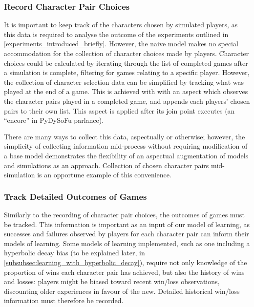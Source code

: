 \subsubsection{Record Character Pair Choices}
It is important to keep track of the characters chosen by simulated players, as
this data is required to analyse the outcome of the experiments outlined in
\cref{experiments_introduced_briefly}. However, the naive model makes no special
accommodation for the collection of character choices made by players. Character
choices could be calculated by iterating through the list of completed games
after a simulation is complete, filtering for games relating to a specific
player. However, the collection of character selection data can be simplified by
tracking what was played at the end of a game. This is achieved with with an
aspect which observes the character pairs played in a completed game, and
appends each players' chosen pairs to their own list. This aspect is applied
after its join point executes (an ``encore'' in PyDySoFu
parlance).

There are many ways to collect this data, aspectually or otherwise; however, the
simplicity of collecting information mid-process without requiring modification
of a base model demonstrates the flexibility of an aspectual augmentation of
models and simulations as an approach. Collection of chosen character pairs
mid-simulation is an opportune example of this convenience.

\subsubsection{Track Detailed Outcomes of
Games}\label{subsubsec:detailed_game_outcome_tracking_aspect} Similarly to the
recording of character pair choices, the outcomes of games must be tracked. This
information is important as an input of our model of learning, as successes and
failures observed by players for each character pair can inform their models of
learning. Some models of learning implemented, such as one including a
hyperbolic decay bias (to be explained later, in
\cref{subsubsec:learning_with_hyperbolic_decay}), require not only knowledge of
the proportion of wins each character pair has achieved, but also the history of
wins and losses: players might be biased toward recent win/loss observations,
discounting older experiences in favour of the new. Detailed historical win/loss
information must therefore be recorded.

